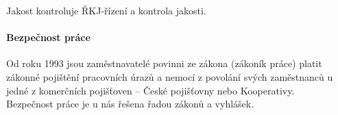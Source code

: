 \documentclass[11pt,a4paper,twoside]{book}
\begin{document}
	Jakost kontroluje ŘKJ-řízení a kontrola jakosti.

	\paragraph*{Bezpečnost práce}
	Od roku 1993 jsou zaměstnavatelé povinni ze zákona (zákoník práce) platit zákonné pojištění pracovních úrazů a nemocí z povolání svých zaměstnanců u jedné z komerčních pojišťoven -- České pojišťovny nebo Kooperativy. \\ Bezpečnost práce je u nás řešena řadou zákonů a vyhlášek.
\end{document}
